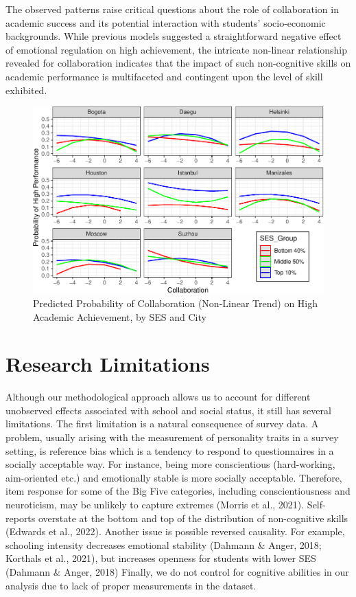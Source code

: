 \documentclass{article}
\begin{document}
The observed patterns raise critical questions about the role of
collaboration in academic success and its potential interaction with
students' socio-economic backgrounds. While previous models suggested a
straightforward negative effect of emotional regulation on high
achievement, the intricate non-linear relationship revealed for
collaboration indicates that the impact of such non-cognitive skills on
academic performance is multifaceted and contingent upon the level of
skill exhibited.

\begin{figure}
\centering
\includegraphics{working_paper_files/figure-latex/collaboration-1.pdf}
\caption{Predicted Probability of Collaboration (Non-Linear Trend) on
High Academic Achievement, by SES and City}
\end{figure}

\hypertarget{research-limitations}{%
\section{Research Limitations}\label{research-limitations}}

Although our methodological approach allows us to account for different
unobserved effects associated with school and social status, it still
has several limitations. The first limitation is a natural consequence
of survey data. A problem, usually arising with the measurement of
personality traits in a survey setting, is reference bias which is a
tendency to respond to questionnaires in a socially acceptable way. For
instance, being more conscientious (hard-working, aim-oriented etc.) and
emotionally stable is more socially acceptable. Therefore, item response
for some of the Big Five categories, including conscientiousness and
neuroticism, may be unlikely to capture extremes (Morris et al., 2021).
Self-reports overstate at the bottom and top of the distribution of
non-cognitive skills (Edwards et al., 2022). Another issue is possible
reversed causality. For example, schooling intensity decreases emotional
stability (Dahmann \& Anger, 2018; Korthals et al., 2021), but increases
openness for students with lower SES (Dahmann \& Anger, 2018) Finally,
we do not control for cognitive abilities in our analysis due to lack of
proper measurements in the dataset.
\end{document}
